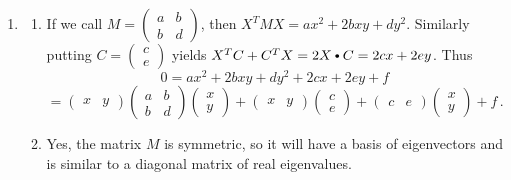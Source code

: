 \begin{enumerate}
\item 
\begin{enumerate}
\item If we call $M=\begin{pmatrix}a&b\\b&d\end{pmatrix}$, then $X^TMX=ax^2 + 2bxy + dy^2$.
Similarly putting $C=\begin{pmatrix}c\\e\end{pmatrix}$ yields $X^T C + C^T X = 2 X \dotprod C = 2 cx + 2 e y$. Thus
\[
0=
ax^2 + 2bxy + dy^2+2cx+2ey+f\]
\[=\begin{pmatrix} x & y\end{pmatrix} \begin{pmatrix}a&b\\b&d\end{pmatrix}
\begin{pmatrix} x \\ y\end{pmatrix}+ 
\begin{pmatrix} x & y\end{pmatrix}\begin{pmatrix}c\\e\end{pmatrix}+
\begin{pmatrix} c & e\end{pmatrix}\begin{pmatrix}x\\y\end{pmatrix}+f\, .
\]
\item Yes, the matrix $M$ is symmetric, so it will have a basis of eigenvectors and is similar to
a diagonal matrix of real eigenvalues.


\end{enumerate}
\end{enumerate}
